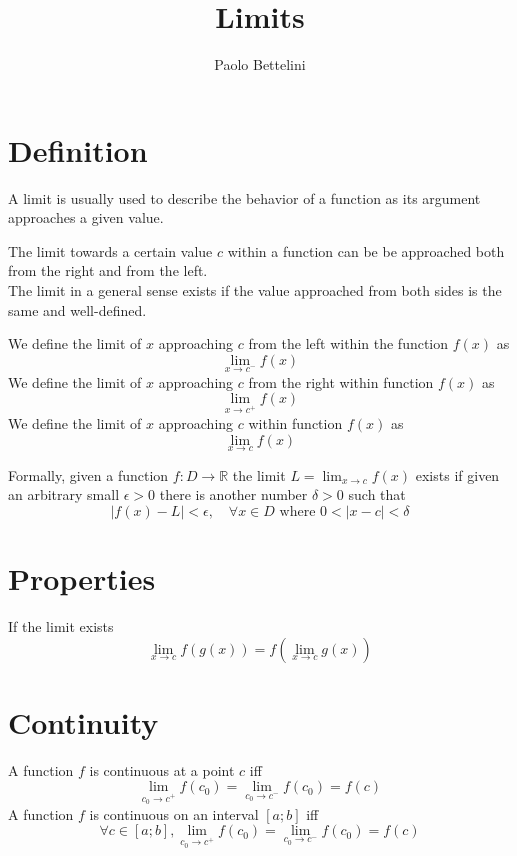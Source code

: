 \documentclass{article}
\title{Limits}
\author{Paolo Bettelini}
\date{}
\begin{document}
\maketitle
\tableofcontents
\pagebreak

\section{Definition}

A limit is usually used to describe the behavior of a function as its argument approaches a given value.

The limit towards a certain value \(c\) within a function can be be approached both from the right and from the left. \\
The limit in a general sense exists if the value approached from both sides is the same and well-defined.

We define the limit of \(x\) approaching \(c\) from the left within the function \(f(x)\) as
\[
    \lim_{x\to c^{-}}f(x)
\]
We define the limit of \(x\) approaching \(c\) from the right within function \(f(x)\) as
\[
    \lim_{x\to c^{+}}f(x)
\]
We define the limit of \(x\) approaching \(c\) within function \(f(x)\) as
\[
    \lim_{x\to c}f(x)
\]

Formally, given a function \(f:D\to \mathbb{R}\) the limit \(L=\lim_{x\to c}f(x)\) exists if given an arbitrary small \(\epsilon >0\) there is another number \(\delta >0\) such that
\[
    |f(x)-L|<\epsilon,\quad
    \forall x\in D \text{ where } 0<|x-c|<\delta
\]

\section{Properties}

If the limit exists
\[
    \lim_{x\to c}f(g(x))=f(\lim_{x\to c}g(x))
\]

\section{Continuity}

A function \(f\) is continuous at a point \(c\) iff
\[
    \lim_{c_0 \to c^+} f(c_0) = \lim_{c_0 \to c^-} f(c_0) = f(c)
\]
A function \(f\) is continuous on an interval \([a;b]\) iff
\[
    \forall c \in [a;b],
    \lim_{c_0 \to c^+} f(c_0) = \lim_{c_0 \to c^-} f(c_0) = f(c)
\]

\pagebreak
\end{document}
